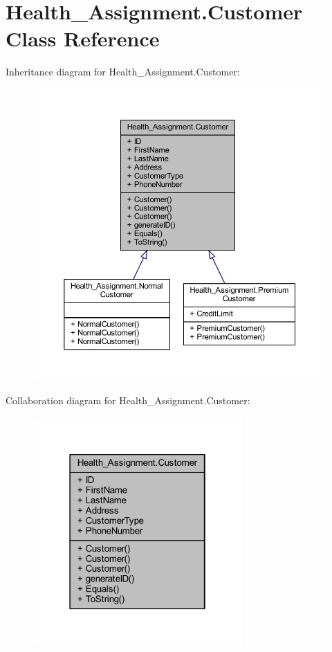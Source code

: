 \hypertarget{class_health___assignment_1_1_customer}{}\section{Health\+\_\+\+Assignment.\+Customer Class Reference}
\label{class_health___assignment_1_1_customer}


Inheritance diagram for Health\+\_\+\+Assignment.\+Customer\+:\nopagebreak
\begin{figure}[H]
\begin{center}
\leavevmode
\includegraphics[width=350pt]{class_health___assignment_1_1_customer__inherit__graph}
\end{center}
\end{figure}


Collaboration diagram for Health\+\_\+\+Assignment.\+Customer\+:\nopagebreak
\begin{figure}[H]
\begin{center}
\leavevmode
\includegraphics[width=226pt]{class_health___assignment_1_1_customer__coll__graph}
\end{center}
\end{figure}
